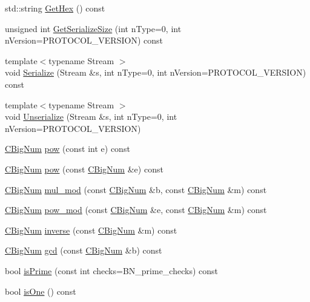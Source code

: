 \begin{DoxyCompactItemize}
std\+::string \hyperlink{class_c_big_num_afdfc11e08c544e06e2877767b3fb8730}{Get\+Hex} () const 
\item 
unsigned int \hyperlink{class_c_big_num_afea3e99a3610f44c90c1242a324fd002}{Get\+Serialize\+Size} (int n\+Type=0, int n\+Version=P\+R\+O\+T\+O\+C\+O\+L\+\_\+\+V\+E\+R\+S\+I\+O\+N) const 
\item 
{\footnotesize template$<$typename Stream $>$ }\\void \hyperlink{class_c_big_num_a710a9e85375ec80a4fbbfaa5341baa1b}{Serialize} (Stream \&s, int n\+Type=0, int n\+Version=P\+R\+O\+T\+O\+C\+O\+L\+\_\+\+V\+E\+R\+S\+I\+O\+N) const 
\item 
{\footnotesize template$<$typename Stream $>$ }\\void \hyperlink{class_c_big_num_aa70f21429cc04c2dbee78189c454bac2}{Unserialize} (Stream \&s, int n\+Type=0, int n\+Version=P\+R\+O\+T\+O\+C\+O\+L\+\_\+\+V\+E\+R\+S\+I\+O\+N)
\item 
\hyperlink{class_c_big_num}{C\+Big\+Num} \hyperlink{class_c_big_num_ab381ce930b1e9e3f04bf5827623c44af}{pow} (const int e) const 
\item 
\hyperlink{class_c_big_num}{C\+Big\+Num} \hyperlink{class_c_big_num_a7da305f67b92265316d02c1cd33f95b7}{pow} (const \hyperlink{class_c_big_num}{C\+Big\+Num} \&e) const 
\item 
\hyperlink{class_c_big_num}{C\+Big\+Num} \hyperlink{class_c_big_num_a17c140842bacbb1e2f03b3677f0075b9}{mul\+\_\+mod} (const \hyperlink{class_c_big_num}{C\+Big\+Num} \&b, const \hyperlink{class_c_big_num}{C\+Big\+Num} \&m) const 
\item 
\hyperlink{class_c_big_num}{C\+Big\+Num} \hyperlink{class_c_big_num_a0f2a7b0ec9115d70a7abd6d77643cfec}{pow\+\_\+mod} (const \hyperlink{class_c_big_num}{C\+Big\+Num} \&e, const \hyperlink{class_c_big_num}{C\+Big\+Num} \&m) const 
\item 
\hyperlink{class_c_big_num}{C\+Big\+Num} \hyperlink{class_c_big_num_a33a8ba28c9e6efe911ed3a8227a81481}{inverse} (const \hyperlink{class_c_big_num}{C\+Big\+Num} \&m) const 
\item 
\hyperlink{class_c_big_num}{C\+Big\+Num} \hyperlink{class_c_big_num_a4058ecf3603cd65c8f3effd7cef67dff}{gcd} (const \hyperlink{class_c_big_num}{C\+Big\+Num} \&b) const 
\item 
bool \hyperlink{class_c_big_num_a48650eae8b50c6a1421bd5a5ee0c38c5}{is\+Prime} (const int checks=B\+N\+\_\+prime\+\_\+checks) const 
\item 
bool \hyperlink{class_c_big_num_a74d629a04c32c7bbb1419a0cef785431}{is\+One} () const 

\end{DoxyCompactItemize}
